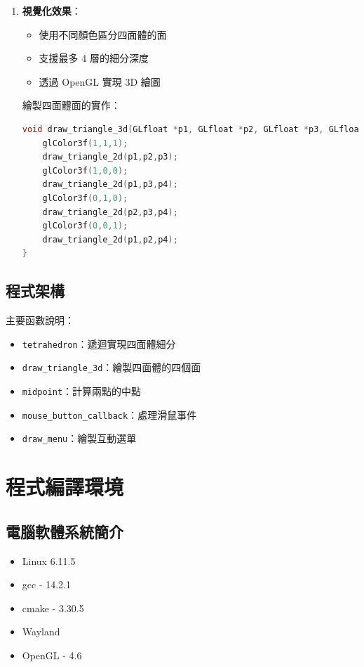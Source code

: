 \documentclass[12pt,a4paper]{article}
\begin{document}
\begin{enumerate}
  \item \textbf{視覺化效果}：
    \begin{itemize}
      \item 使用不同顏色區分四面體的面
      \item 支援最多 4 層的細分深度
      \item 透過 OpenGL 實現 3D 繪圖
    \end{itemize}
    
    繪製四面體面的實作：
    \begin{lstlisting}[language=C++,breaklines=true]
void draw_triangle_3d(GLfloat *p1, GLfloat *p2, GLfloat *p3, GLfloat *p4) {
    glColor3f(1,1,1);
    draw_triangle_2d(p1,p2,p3);
    glColor3f(1,0,0);
    draw_triangle_2d(p1,p3,p4);
    glColor3f(0,1,0);
    draw_triangle_2d(p2,p3,p4);
    glColor3f(0,0,1);
    draw_triangle_2d(p1,p2,p4);
}
    \end{lstlisting}
\end{enumerate}

\subsection*{程式架構}
\noindent 主要函數說明：
\begin{itemize}
  \item \texttt{tetrahedron}：遞迴實現四面體細分
  \item \texttt{draw\_triangle\_3d}：繪製四面體的四個面
  \item \texttt{midpoint}：計算兩點的中點
  \item \texttt{mouse\_button\_callback}：處理滑鼠事件
  \item \texttt{draw\_menu}：繪製互動選單
\end{itemize}



\section*{程式編譯環境}
\subsection*{電腦軟體系統簡介}
\begin{itemize}
  \item Linux 6.11.5
  \item gcc - 14.2.1
  \item cmake - 3.30.5
  \item Wayland
  \item OpenGL - 4.6 
\end{itemize}
\end{document}
